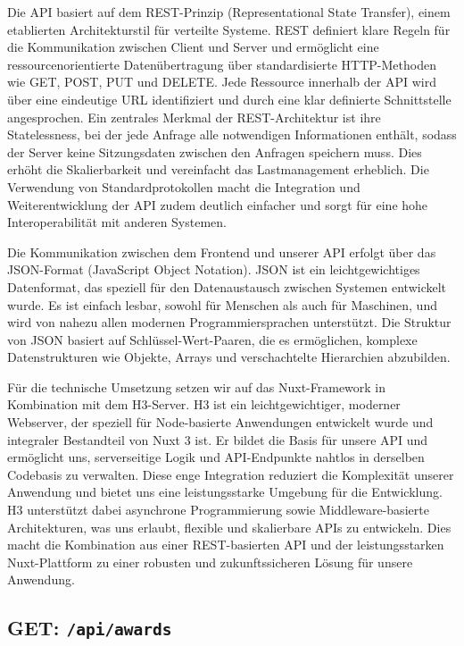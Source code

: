 \documentclass[a4paper,12pt]{article}
\begin{document}
Die API basiert auf dem REST-Prinzip (Representational State Transfer), einem
etablierten Architekturstil für verteilte Systeme. REST definiert klare Regeln
für die Kommunikation zwischen Client und Server und ermöglicht eine
ressourcenorientierte Datenübertragung über standardisierte HTTP-Methoden wie
GET, POST, PUT und DELETE. Jede Ressource innerhalb der API wird über eine
eindeutige URL identifiziert und durch eine klar definierte Schnittstelle
angesprochen. Ein zentrales Merkmal der REST-Architektur ist ihre
Statelessness, bei der jede Anfrage alle notwendigen Informationen enthält,
sodass der Server keine Sitzungsdaten zwischen den Anfragen speichern muss.
Dies erhöht die Skalierbarkeit und vereinfacht das Lastmanagement erheblich.
Die Verwendung von Standardprotokollen macht die Integration und
Weiterentwicklung der API zudem deutlich einfacher und sorgt für eine hohe
Interoperabilität mit anderen Systemen.

Die Kommunikation zwischen dem Frontend und unserer API erfolgt über das
JSON-Format (JavaScript Object Notation). JSON ist ein leichtgewichtiges
Datenformat, das speziell für den Datenaustausch zwischen Systemen entwickelt
wurde. Es ist einfach lesbar, sowohl für Menschen als auch für Maschinen, und
wird von nahezu allen modernen Programmiersprachen unterstützt. Die Struktur
von JSON basiert auf Schlüssel-Wert-Paaren, die es ermöglichen, komplexe
Datenstrukturen wie Objekte, Arrays und verschachtelte Hierarchien abzubilden.

Für die technische Umsetzung setzen wir auf das Nuxt-Framework in Kombination
mit dem H3-Server. H3 ist ein leichtgewichtiger, moderner Webserver, der
speziell für Node-basierte Anwendungen entwickelt wurde und integraler
Bestandteil von Nuxt 3 ist. Er bildet die Basis für unsere API und ermöglicht
uns, serverseitige Logik und API-Endpunkte nahtlos in derselben Codebasis zu
verwalten. Diese enge Integration reduziert die Komplexität unserer Anwendung
und bietet uns eine leistungsstarke Umgebung für die Entwicklung. H3
unterstützt dabei asynchrone Programmierung sowie Middleware-basierte
Architekturen, was uns erlaubt, flexible und skalierbare APIs zu entwickeln.
Dies macht die Kombination aus einer REST-basierten API und der
leistungsstarken Nuxt-Plattform zu einer robusten und zukunftssicheren Lösung
für unsere Anwendung.

\subsection{GET: \texttt{/api/awards}}
\end{document}
